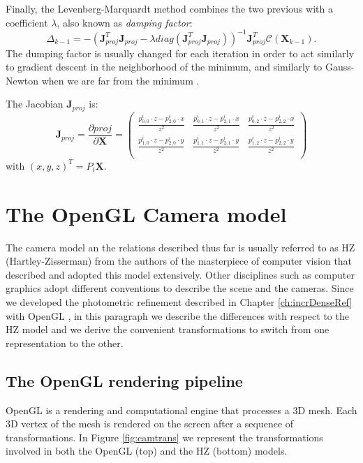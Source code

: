 Finally, the Levenberg-Marquardt method combines the two previous with a coefficient $\lambda$, also known as \emph{damping factor}:
\begin{equation}
  \label{eq:l-m}
 \Delta_{k-1} = - (\mathbf{J}_{proj}^T\mathbf{J}_{proj} - \lambda diag(\mathbf{J}_{proj}^T \mathbf{J}_{proj}))^{-1}\mathbf{J}_{proj}^T \mathcal{C}(\mathbf{X}_{k-1}).
\end{equation}
The dumping factor is usually changed for each iteration in order to act similarly to gradient descent in the neighborhood of the minimum, and similarly to Gauss-Newton when we are far from the minimum \cite{Lo05}.

The Jacobian $\mathbf{J}_{proj}$ is:
\begin{equation}
  \mathbf{J}_{proj}=\frac{\partial proj}{\partial \mathbf{X}} =
  \begin{pmatrix}
   \frac{p_{0,0}^i \cdot z - p_{2,0}^i \cdot x}{z^2} & \frac{p_{0,1}^i \cdot z - p_{2,1}^i \cdot x}{z^2} & \frac{p_{0,2}^i \cdot z - p_{2,2}^i \cdot x}{z^2}\\
   \frac{p_{1,0}^i \cdot z - p_{2,0}^i \cdot y}{z^2} & \frac{p_{1,1}^i \cdot z - p_{2,1}^i \cdot y}{z^2} & \frac{p_{1,2}^i \cdot z - p_{2,2}^i \cdot y}{z^2}\\
  \end{pmatrix}
\end{equation}
with $(x,y,z)^T = P_i \mathbf{X}$.


\section{The OpenGL Camera model}
The camera model an the relations described thus far is usually referred to as HZ (Hartley-Zisserman) from the authors of the masterpiece of computer vision \cite{hazi04} that described and adopted this model extensively.
Other disciplines such as computer graphics adopt different conventions to describe the scene and the cameras. 
Since we developed the photometric refinement described in Chapter \ref{ch:incrDenseRef} with OpenGL \cite{opengl}, in this paragraph we describe the differences with respect to the HZ model and we derive the convenient transformations to switch from one representation to the other.

\subsection{The OpenGL rendering pipeline}
OpenGL is a rendering and computational engine that processes a 3D mesh. 
Each 3D vertex of the mesh is rendered on the screen after a sequence of transformations. In Figure \ref{fig:camtrans} we represent the transformations involved in both the OpenGL (top) and the HZ (bottom) models.

